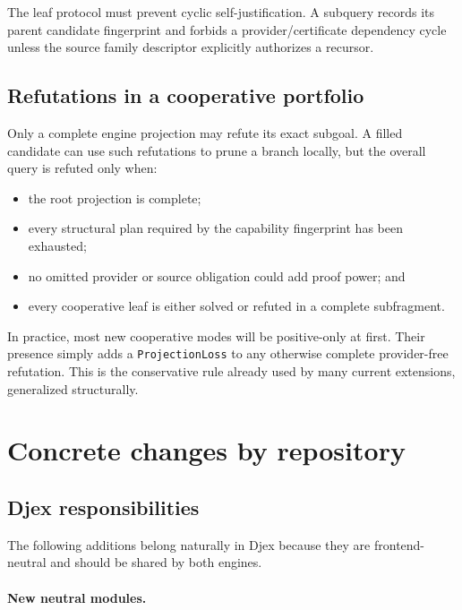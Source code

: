 \documentclass[11pt]{article}
\newcommand{\code}[1]{\texttt{#1}}
\newcommand{\Djex}{\textsf{Djex}}
\begin{document}
The leaf protocol must prevent cyclic self-justification.  A subquery records
its parent candidate fingerprint and forbids a provider/certificate dependency
cycle unless the source family descriptor explicitly authorizes a recursor.

\subsection{Refutations in a cooperative portfolio}

Only a complete engine projection may refute its exact subgoal.  A filled
candidate can use such refutations to prune a branch locally, but the overall
query is refuted only when:

\begin{itemize}
  \item the root projection is complete;
  \item every structural plan required by the capability fingerprint has been
    exhausted;
  \item no omitted provider or source obligation could add proof power; and
  \item every cooperative leaf is either solved or refuted in a complete
    subfragment.
\end{itemize}

In practice, most new cooperative modes will be positive-only at first.  Their
presence simply adds a \code{ProjectionLoss} to any otherwise complete
provider-free refutation.  This is the conservative rule already used by many
current extensions, generalized structurally.

\section{Concrete changes by repository}
\label{sec:repo-changes}

\subsection{Djex responsibilities}

The following additions belong naturally in \Djex{} because they are
frontend-neutral and should be shared by both engines.

\paragraph{New neutral modules.}
\end{document}
